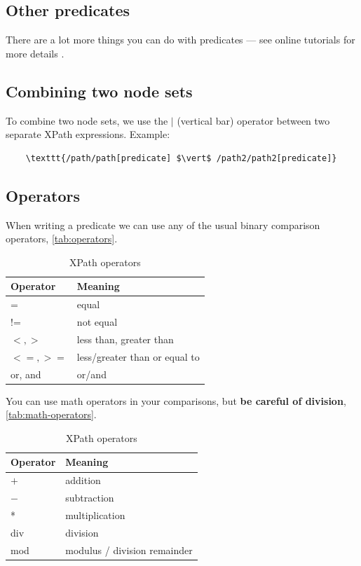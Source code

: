 \documentclass{pgnotes}
\begin{document}
\subsection{Other predicates}

There are a lot more things you can do with predicates --- see online tutorials for more details \cite{w3-schools:2013:xpath}. 

\subsection{Combining two node sets}

To combine two node sets, we use the $\vert$ (vertical bar) operator between two separate XPath expressions.
Example: 

\begin{verbatim}
    \texttt{/path/path[predicate] $\vert$ /path2/path2[predicate]}
\end{verbatim}



\subsection{Operators}

When writing a predicate we can use any of the usual binary comparison operators, \autoref{tab:operators}.

\begin{table}[htbp]
  \centering
  \begin{tabular}{l l}
    \toprule
    \textbf{Operator} & \textbf{Meaning} \\
    \midrule
    = & equal \\
    != & not equal \\
    $<, >$ & less than, greater than \\
    $<=, >=$ & less/greater than or equal to \\
    or, and & or/and \\
    \bottomrule
  \end{tabular}
  \caption{XPath operators}
  \label{tab:operators}
\end{table}

You can use math operators in your comparisons, but \textbf{be careful of division}, \autoref{tab:math-operators}. 

\begin{table}[htbp]
  \centering
  \begin{tabular}{l l}
    \toprule
    \textbf{Operator} & \textbf{Meaning} \\
    \midrule
    $+$ & addition \\
    $-$ & subtraction \\
    * & multiplication \\
    div & division \\
    mod & modulus / division remainder\\
    \bottomrule
  \end{tabular}
  \caption{XPath operators}
  \label{tab:math-operators}
\end{table}
\end{document}
